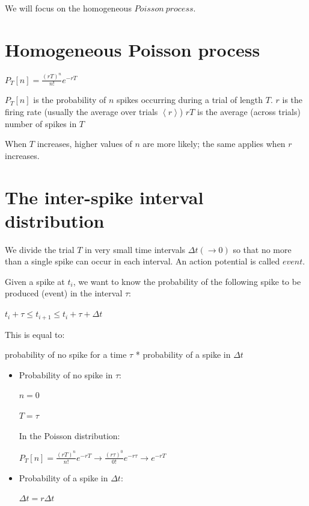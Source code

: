\documentclass[12pt]{article}
\begin{document}
We will focus on the homogeneous $Poisson\ process$.

\section{Homogeneous Poisson process}

\begin{center}
	$P_T[n] = \frac{(rT)^n}{n!}e^{-rT}$
\end{center}

$P_T[n]$ is the probability of $n$ spikes occurring during a trial of length $T$.
$r$ is the firing rate (usually the average over trials $\left \langle r \right \rangle$)
$rT$ is the average (across trials) number of spikes in $T$

When $T$ increases, higher values of $n$ are more likely; the same applies when $r$ increases.

\section{The inter-spike interval distribution}

We divide the trial $T$ in very small time intervals $\Delta t (\rightarrow 0)$ so that no more than a single spike can occur in each interval. An action potential is called $event$.

Given a spike at $t_i$, we want to know the probability of the following spike to be produced (event) in the interval $\tau$:

\begin{center}
	$t_i + \tau \leq t_{i+1} \leq t_i + \tau + \Delta t$
\end{center}


This is equal to:

\begin{center}
	probability of no spike for a time $\tau$ * probability of a spike in $\Delta t$
\end{center}

\begin{itemize}

	\item Probability of no spike in $\tau$:
		\begin{center}
			$n = 0$
		\end{center}
		\begin{center}
			$T = \tau$
		\end{center}

		In the Poisson distribution:

		\begin{center}
			$P_T[n] = \frac{(rT)^n}{n!}e^{-rT} \rightarrow \frac{(r \tau)^0}{0!}e^{-r \tau} \rightarrow e^{-rT}$ 
		\end{center}

	\item Probability of a spike in $\Delta t$:
		\begin{center}
			$\Delta t = r \Delta t$
		\end{center}
\end{itemize}
\end{document}
